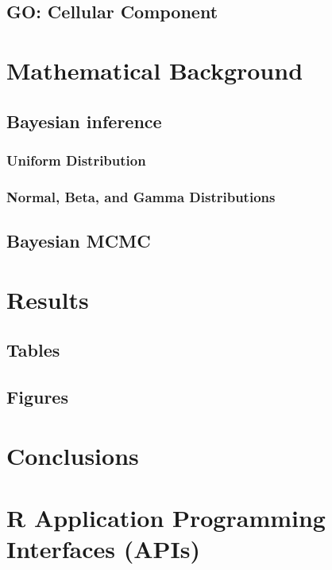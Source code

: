 \subsection{GO: Cellular Component}

\section{Mathematical Background}

\subsection{Bayesian inference}

\subsubsection{Uniform Distribution}

\subsubsection{Normal, Beta, and Gamma Distributions}

\subsection{Bayesian MCMC}


\section{Results}

\subsection{Tables}

\subsection{Figures}


\section{Conclusions}


\section{R Application Programming Interfaces (APIs)}


